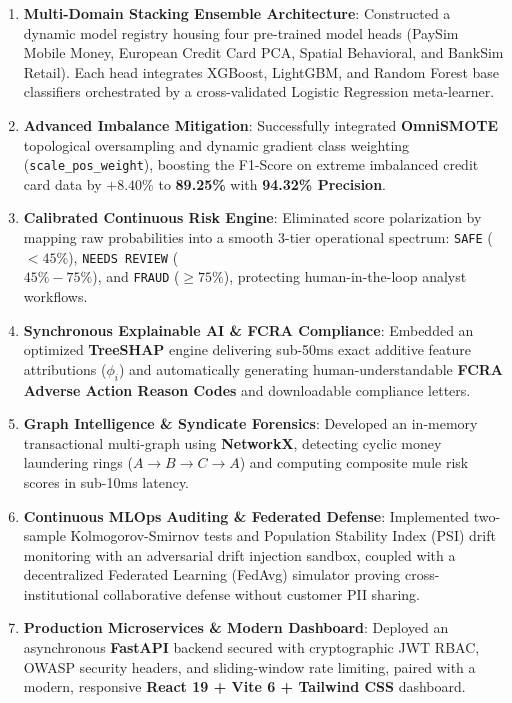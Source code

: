 \documentclass[12pt,a4paper,oneside]{report}
\begin{document}
\begin{enumerate}[leftmargin=0.35in]
\item \textbf{Multi-Domain Stacking Ensemble Architecture}: Constructed a dynamic model registry housing four pre-trained model heads (PaySim Mobile Money, European Credit Card PCA, Spatial Behavioral, and BankSim Retail). Each head integrates XGBoost, LightGBM, and Random Forest base classifiers orchestrated by a cross-validated Logistic Regression meta-learner.
\item \textbf{Advanced Imbalance Mitigation}: Successfully integrated \textbf{OmniSMOTE} topological oversampling and dynamic gradient class weighting (\texttt{scale\_pos\_weight}), boosting the F1-Score on extreme imbalanced credit card data by $+8.40\%$ to \textbf{89.25\%} with \textbf{94.32\% Precision}.
\item \textbf{Calibrated Continuous Risk Engine}: Eliminated score polarization by mapping raw probabilities into a smooth 3-tier operational spectrum: \texttt{SAFE} ($< 45\%$), \texttt{NEEDS REVIEW} (\\$45\%-75\%$), and \texttt{FRAUD} ($\ge 75\%$), protecting human-in-the-loop analyst workflows.
\item \textbf{Synchronous Explainable AI \& FCRA Compliance}: Embedded an optimized \textbf{TreeSHAP} engine delivering sub-50ms exact additive feature attributions ($\phi_i$) and automatically generating human-understandable \textbf{FCRA Adverse Action Reason Codes} and downloadable compliance letters.
\item \textbf{Graph Intelligence \& Syndicate Forensics}: Developed an in-memory transactional multi-graph using \textbf{NetworkX}, detecting cyclic money laundering rings ($A \rightarrow B \rightarrow C \rightarrow A$) and computing composite mule risk scores in sub-10ms latency.
\item \textbf{Continuous MLOps Auditing \& Federated Defense}: Implemented two-sample Kolmogorov-Smirnov tests and Population Stability Index (PSI) drift monitoring with an adversarial drift injection sandbox, coupled with a decentralized Federated Learning (FedAvg) simulator proving cross-institutional collaborative defense without customer PII sharing.
\item \textbf{Production Microservices \& Modern Dashboard}: Deployed an asynchronous \textbf{FastAPI} backend secured with cryptographic JWT RBAC, OWASP security headers, and sliding-window rate limiting, paired with a modern, responsive \textbf{React 19 + Vite 6 + Tailwind CSS} dashboard.
\end{enumerate}
\end{document}
